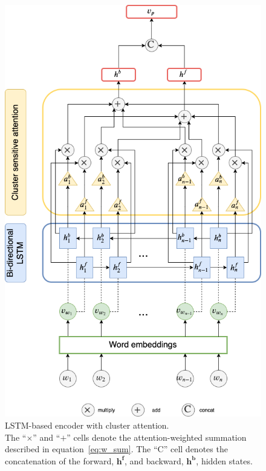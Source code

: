 \documentclass{bmcart}
\begin{document}
\begin{backmatter}
\begin{figure}[h!]
    \label{fig:NEAT}
\end{figure}
\pagebreak
\begin{figure}[h!]
    \centering
    \captionsetup{justification=centering}
    \includegraphics[scale=0.5]{lstm.png}
    \caption{LSTM-based encoder with cluster attention. \\ The ``$\times$'' and ``$+$'' cells denote the attention-weighted summation described in equation~\ref{eq:w_sum}. The ``$\text{C}$'' cell denotes the concatenation of the forward, $\boldsymbol{h^f}$, and backward, $\boldsymbol{h^b}$, hidden states.}
    \label{fig:RNNEncoders}
\end{figure}
\pagebreak
\begin{figure}[h!]

\end{figure}
\end{backmatter}
\end{document}
